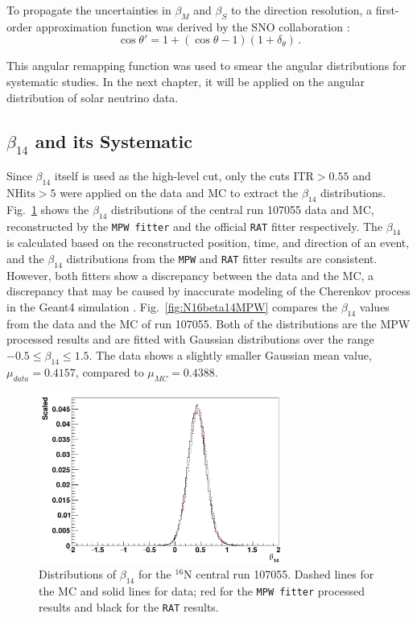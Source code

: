 To propagate the uncertainties in $\beta_M$ and $\beta_S$ to the direction resolution, a first-order approximation function was derived by the SNO collaboration \cite{drouin2012three}:
\begin{equation}\label{remapTheta}
\cos\theta'=1+(\cos\theta-1)(1+\delta_{\theta}) \, .
\end{equation}

This angular remapping function was used to smear the angular distributions for systematic studies. In the next chapter, it will be applied on the angular distribution of solar neutrino data. 

\subsection{$\beta_{14}$ and its Systematic}

Since $\beta_{14}$ itself is used as the high-level cut, only the cuts $\mathrm{ITR}>0.55$ and $\mathrm{NHits}>5$ were applied on the data and MC to extract the $\beta_{14}$ distributions. Fig.~\ref{fig:N16beta14} shows the $\beta_{14}$ distributions of the central run 107055 data and MC, reconstructed by the \texttt{MPW fitter} and the official \texttt{RAT} fitter respectively. The $\beta_{14}$ is calculated based on the reconstructed position, time, and direction of an event, and the $\beta_{14}$ distributions from the \texttt{MPW} and \texttt{RAT} fitter results are consistent. However, both fitters show a discrepancy between the data and the MC, a discrepancy that may be caused by inaccurate modeling of the Cherenkov process in the Geant4 simulation \cite{dunmore2004separation,beta14discrepancy}. Fig.~\ref{fig:N16beta14MPW} compares the $\beta_{14}$ values from the data and the MC of run 107055. Both of the distributions are the MPW processed results and are fitted with Gaussian distributions over the range $-0.5 \le \beta_{14} \le 1.5$. The data shows a slightly smaller Gaussian mean value, $\mu_{data}=0.4157$, compared to $\mu_{MC}=0.4388$.

\begin{figure}[htbp]
	\centering
	\includegraphics[width=8cm]{N16_beta14_107055.png}
	\caption[Distributions of $\beta_{14}$ for the $^{16}$N central run 107055.]{Distributions of $\beta_{14}$ for the $^{16}$N central run 107055. Dashed lines for the MC and solid lines for data; red for the \texttt{MPW fitter} processed results and black for the \texttt{RAT} results. \label{fig:N16beta14}}
\end{figure}

